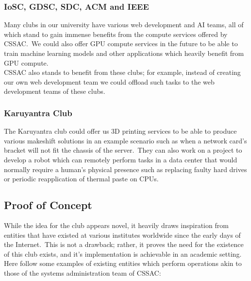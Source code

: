 \subsubsection{IoSC, GDSC, SDC, ACM and IEEE}
Many clubs in our university have various web development and AI teams, all of which stand to gain immense benefits
from the compute services offered by CSSAC.\ We could also offer GPU compute services in the future to be able to
train machine learning models and other applications which heavily benefit from GPU compute.
\\
CSSAC also stands to benefit from these clubs; for example, instead of creating our own web development team we
could offload such tasks to the web development teams of these clubs\@.

\subsubsection{Karuyantra Club}
The Karuyantra club could offer us 3D printing services to be able to produce various makeshift solutions in an
example scenario such as when a network card's bracket will not fit the chassis of the server.\ They can also
work on a project to develop a robot which can remotely perform tasks in a data center that would normally require a
human's physical presence such as replacing faulty hard drives or periodic reapplication of thermal paste on CPUs.


\subsection{Proof of Concept}\label{subsec:proof-of-concept}

While the idea for the club appears novel, it heavily draws inspiration from entities that have existed at various
institutes worldwide since the early days of the Internet.\ This is not a drawback; rather, it proves the need for
the existence of this club exists, and it's implementation is achievable in an academic setting.
\\
Here follow some examples of existing entities which perform operations akin to those of the systems administration
team of CSSAC:

